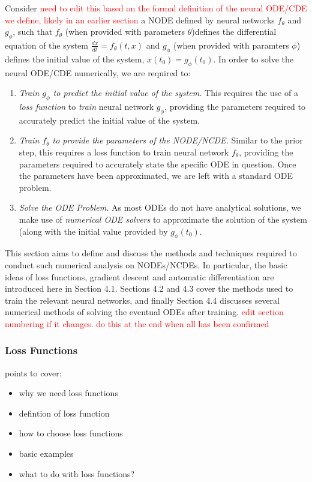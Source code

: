 \documentclass[a4paper,11pt, titlepage]{article}
\theoremstyle{definition}
\theoremstyle{plain}
\theoremstyle{remark}
\begin{document}
Consider \textcolor{red}{need to edit this based on the formal definition of the neural ODE/CDE we define, likely in an earlier section} a NODE defined by neural networks $f_\theta$ and $g_\phi$, such that $f_\theta$ (when provided with parameters $\theta$)defines the differential equation of the system $\frac{dx}{dt} = f_\theta\left(t, x\right)$ and $g_\phi$ (when provided with paramters $\phi$) defines the initial value of the system, $x\left(t_0\right) = g_\phi(t_0)$. In order to solve the neural ODE/CDE numerically, we are required to: 
\begin{enumerate}
    \item \textit{Train $g_\phi$ to predict the initial value of the system.} This requires the use of a \textit{loss function} to \textit{train} neural network $g_\phi$, providing the parameters required to accurately predict the initial value of the system. 
    \item \textit{Train $f_\theta$ to provide the parameters of the NODE/NCDE.} Similar to the prior step, this requires a loss function to train neural network $f_\theta$, providing the parameters required to accurately state the specific ODE in question. Once the parameters have been approximated, we are left with a standard ODE problem.
    \item \textit{Solve the ODE Problem.} As most ODEs do not have analytical solutions, we make use of \textit{numerical ODE solvers} to approximate the solution of the system (along with the initial value provided by $g_\phi\left(t_0\right)$.
\end{enumerate}

This section aims to define and discuss the methods and techniques required to conduct such numerical analysis on NODEs/NCDEs. In particular, the basic ideas of loss functions, gradient descent and automatic differentiation are introduced here in Section 4.1. Sections 4.2 and 4.3 cover the methods used to train the relevant neural networks, and finally Section 4.4 discusses several numerical methods of solving the eventual ODEs after training. \textcolor{red}{edit section numbering if it changes. do this at the end when all has been confirmed}

\subsubsection{Loss Functions}
points to cover:
\begin{itemize}
    \item why we need loss functions
    \item defintion of loss function
    \item how to choose loss functions
    \item basic examples
    \item what to do with loss functions?
\end{itemize}
\end{document}
